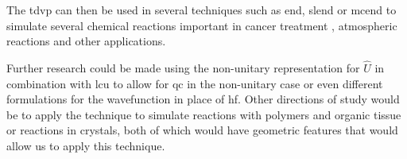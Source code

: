 \documentclass{aux/ttuthes2007}
\begin{document}
The \gls{tdvp} can then be used in several techniques such as \gls{end}, \gls{slend} or \gls{mcend} to simulate several chemical reactions important in cancer treatment , atmospheric reactions  and other applications.

Further research could be made using the non-unitary representation for $\hat U$ in combination with \gls{lcu} to allow for \gls{qc} in the non-unitary case or even different formulations for the wavefunction in place of \gls{hf}.
Other directions of study would be to apply the technique to simulate reactions with polymers and organic tissue or reactions in crystals, both of which would have geometric features that would allow us to apply this technique.
\backmatter





\glsaddall

\printnoidxglossary[type=acronym,sort=letter]
\end{document}
